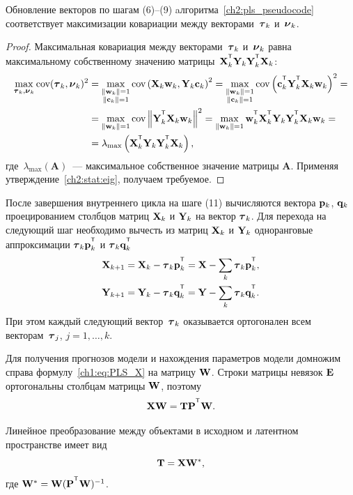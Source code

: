 \begin{statement}
	Обновление векторов по шагам (6)--(9) aлгоритма~\ref{ch2:pls_pseudocode} соответствует максимизации ковариации между векторами~$\boldsymbol{\tau}_k$ и~$\boldsymbol{\nu}_k$.
\end{statement}
\begin{proof}
	Максимальная ковариация между векторами~$\boldsymbol{\tau}_k$ и~$\boldsymbol{\nu}_k$ равна максимальному собственному значению матрицы~$\bX_k^{\T} \bY_k \bY_k^{\T} \bX_k$:
	\begin{align*}
		\max_{\btau_k, \bnu_k}  \text{cov} (\btau_k, \bnu_k)^2 &= \max_{\substack{\|\bw_k\|=1 \\ \|\bc_k\| = 1}} \text{cov} \left( \bX_k \bw_k, \bY_k \bc_k \right)^2 = \max_{\substack{\|\bw_k\|=1 \\ \|\bc_k\| = 1}} \text{cov} \left(\bc_k^{\T}  \bY_k^{\T} \bX_k \bw_k \right)^2 = \\
		&= \max_{\|\bw_k\| = 1} \text{cov} \left\|\bY_k^{\T} \bX_k \bw_k \right\|^2 = \max_{\|\bw_k\| = 1} \bw_k^{\T} \bX_k^{\T} \bY_k \bY_k^{\T} \bX_k \bw_k = \\
		& = \lambda_{\max} \left( \bX_k^{\T} \bY_k \bY_k^{\T} \bX_k \right),
	\end{align*}
	где~$\lambda_{\max} (\mathbf{A})$~--- максимальное собственное значение матрицы $\mathbf{A}$.
	Применяя утверждение~\ref{ch2:stat:eig}, получаем требуемое.
\end{proof}

После завершения внутреннего цикла на шаге (11) вычисляются вектора $\mathbf{p}_k$, $\mathbf{q}_k$ проецированием столбцов матриц $\mathbf{X}_k$ и $\mathbf{Y}_k$ на вектор $\boldsymbol{\tau}_k$. 
Для перехода на следующий шаг необходимо вычесть из матриц $\mathbf{X}_k$ и $\mathbf{Y}_k$ одноранговые аппроксимации $\btau_k \bp_k^{\T}$ и $\btau_k \bq_k^{\T}$
\begin{align*}
	\bX_{k + 1} &= \bX_{k} - \btau_k \bp_k^{\T} = \bX - \sum_k \btau_k \bp_k^{\T}, \\
	\bY_{k + 1} &= \bY_{k} - \btau_k \bq_k^{\T} = \bY - \sum_k \btau_k \bq_k^{\T}.
\end{align*}
При этом каждый следующий вектор~$\boldsymbol{\tau}_k$ оказывается ортогонален всем векторам~$\boldsymbol{\tau}_j$, $j=1, \dots, k$.

Для получения прогнозов модели и нахождения параметров модели 
домножим справа формулу~\eqref{ch1:eq:PLS_X} на матрицу $\mathbf{W}$. Строки матрицы невязок $\mathbf{E}$ ортогональны столбцам матрицы $\mathbf{W}$, поэтому 
\[
\bX \bW = \bT \bP^{\T} \bW.
\] 

Линейное преобразование между объектами в исходном и латентном пространстве имеет вид
\begin{equation}
	\mathbf{T} = \mathbf{X} \mathbf{W}^*,
	\label{ch2:eq:W*}
\end{equation}
где $\bW^* = \bW (\bP^{\T} \bW)^{-1}$. 

